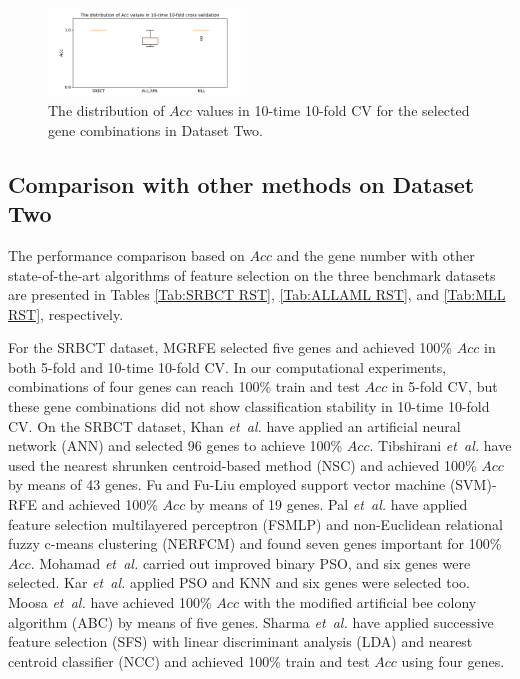 \documentclass[10pt,journal,compsoc]{IEEEtran}
\begin{document}
	\begin{figure}[htbp]
		\centering
		\includegraphics[width=0.47\textwidth]{pictures/CV2.pdf}
		\caption{The distribution of $Acc$ values in 10-time 10-fold CV for the selected gene combinations in Dataset Two.}
		\label{Fig:CV2}
	\end{figure}
	
	\subsection{Comparison with other methods on Dataset Two}
	
	The performance comparison based on \(Acc\) and the gene number with other state-of-the-art algorithms of feature selection on the three benchmark datasets are presented in Tables \ref{Tab:SRBCT RST}, \ref{Tab:ALLAML RST}, and \ref{Tab:MLL RST}, respectively.
	
	For the SRBCT dataset, MGRFE selected five genes and achieved 100\% $Acc$ in both 5-fold and 10-time 10-fold CV. In our computational experiments, combinations of four genes can reach 100\% train and test $Acc$ in 5-fold CV, but these gene combinations did not show classification stability in 10-time 10-fold CV. On the SRBCT dataset, Khan \emph{et~al.} \cite{P13} have applied an artificial neural network (ANN) and selected 96 genes to achieve 100\% $Acc$. Tibshirani \emph{et~al.} \cite{P20} have used the nearest shrunken centroid-based method (NSC) and achieved 100\% $Acc$ by means of 43 genes. Fu and Fu-Liu \cite{P10} employed support vector machine (SVM)-RFE and achieved 100\% $Acc$ by means of 19 genes. Pal \emph{et~al.} \cite{P17} have applied feature selection multilayered perceptron (FSMLP) and non-Euclidean relational fuzzy c-means clustering (NERFCM) and found seven genes important for 100\% $Acc$. Mohamad \emph{et~al.} \cite{P16} carried out improved binary PSO, and six genes were selected. Kar \emph{et~al.} \cite{W15} applied PSO and KNN and six genes were selected too. Moosa \emph{et~al.} \cite{P32} have achieved 100\% $Acc$ with the modified artificial bee colony algorithm (ABC) by means of five genes. Sharma \emph{et~al.} \cite{P18} have applied successive feature selection (SFS) with linear discriminant analysis (LDA) and nearest centroid classifier (NCC) and achieved 100\% train and test $Acc$ using four genes.
	
\end{document}
